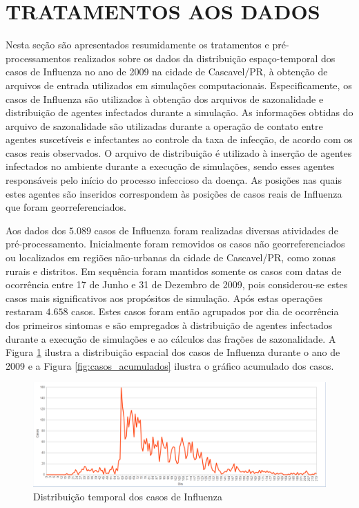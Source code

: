 \section{TRATAMENTOS AOS DADOS}
\label{sec:tratamentosDados}

Nesta seção são apresentados resumidamente os tratamentos e pré-processamentos realizados sobre os dados da distribuição espaço-temporal dos casos de Influenza no ano de 2009 na cidade de Cascavel/PR, à obtenção de arquivos de entrada utilizados em simulações computacionais. Especificamente, os casos de Influenza são utilizados à obtenção dos arquivos de sazonalidade e distribuição de agentes infectados durante a simulação. As informações obtidas do arquivo de sazonalidade são utilizadas durante a operação de contato entre agentes suscetíveis e infectantes ao controle da taxa de infecção, de acordo com os casos reais observados. O arquivo de distribuição é utilizado à inserção de agentes infectados no ambiente durante a execução de simulações, sendo esses agentes responsáveis pelo início do processo infeccioso da doença. As posições nas quais estes agentes são inseridos correspondem às posições de casos reais de Influenza que foram georreferenciados. 

Aos dados dos $5.089$ casos de Influenza foram realizadas diversas atividades de pré-processamento. Inicialmente foram removidos os casos não georreferenciados ou localizados em regiões não-urbanas da cidade de Cascavel/PR, como zonas rurais e distritos. Em sequência foram mantidos somente os casos com datas de ocorrência entre 17 de Junho e 31 de Dezembro de 2009, pois considerou-se estes casos mais significativos aos propósitos de simulação. Após estas operações restaram $4.658$ casos. Estes casos foram então agrupados por dia de ocorrência dos primeiros sintomas e são empregados à distribuição de agentes infectados durante a execução de simulações e ao cálculos das frações de sazonalidade. A Figura \ref{fig:casos} ilustra a distribuição espacial dos casos de Influenza durante o ano de 2009 e a Figura \ref{fig:casos_acumulados} ilustra o gráfico acumulado dos casos.

\begin{figure}[H]
  \centering
  \includegraphics[width=1\textwidth]{Figuras/TratamentosDados/Casos.png}
  \caption{Distribuição temporal dos casos de Influenza}
  \label{fig:casos}
\end{figure} 

